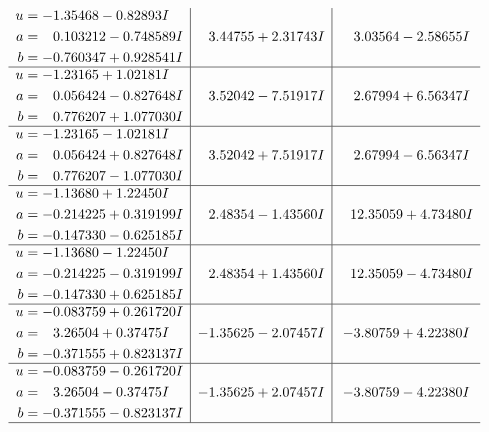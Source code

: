 \documentclass[1p]{elsarticle_modified}
\theoremstyle{definition}
\begin{document}
$$\begin{array}{c|c|c}
\begin{aligned}
u &= -1.35468 - 0.82893 I \\
a &= \phantom{-}0.103212 - 0.748589 I \\
b &= -0.760347 + 0.928541 I\end{aligned}
 & \phantom{-}3.44755 + 2.31743 I & \phantom{-}3.03564 - 2.58655 I \\ \hline\begin{aligned}
u &= -1.23165 + 1.02181 I \\
a &= \phantom{-}0.056424 - 0.827648 I \\
b &= \phantom{-}0.776207 + 1.077030 I\end{aligned}
 & \phantom{-}3.52042 - 7.51917 I & \phantom{-}2.67994 + 6.56347 I \\ \hline\begin{aligned}
u &= -1.23165 - 1.02181 I \\
a &= \phantom{-}0.056424 + 0.827648 I \\
b &= \phantom{-}0.776207 - 1.077030 I\end{aligned}
 & \phantom{-}3.52042 + 7.51917 I & \phantom{-}2.67994 - 6.56347 I \\ \hline\begin{aligned}
u &= -1.13680 + 1.22450 I \\
a &= -0.214225 + 0.319199 I \\
b &= -0.147330 - 0.625185 I\end{aligned}
 & \phantom{-}2.48354 - 1.43560 I & \phantom{-}12.35059 + 4.73480 I \\ \hline\begin{aligned}
u &= -1.13680 - 1.22450 I \\
a &= -0.214225 - 0.319199 I \\
b &= -0.147330 + 0.625185 I\end{aligned}
 & \phantom{-}2.48354 + 1.43560 I & \phantom{-}12.35059 - 4.73480 I \\ \hline\begin{aligned}
u &= -0.083759 + 0.261720 I \\
a &= \phantom{-}3.26504 + 0.37475 I \\
b &= -0.371555 + 0.823137 I\end{aligned}
 & -1.35625 - 2.07457 I & -3.80759 + 4.22380 I \\ \hline\begin{aligned}
u &= -0.083759 - 0.261720 I \\
a &= \phantom{-}3.26504 - 0.37475 I \\
b &= -0.371555 - 0.823137 I\end{aligned}
 & -1.35625 + 2.07457 I & -3.80759 - 4.22380 I\\
 \hline 
 \end{array}$$\newpage\newpage\renewcommand{\arraystretch}{1}
\end{document}
